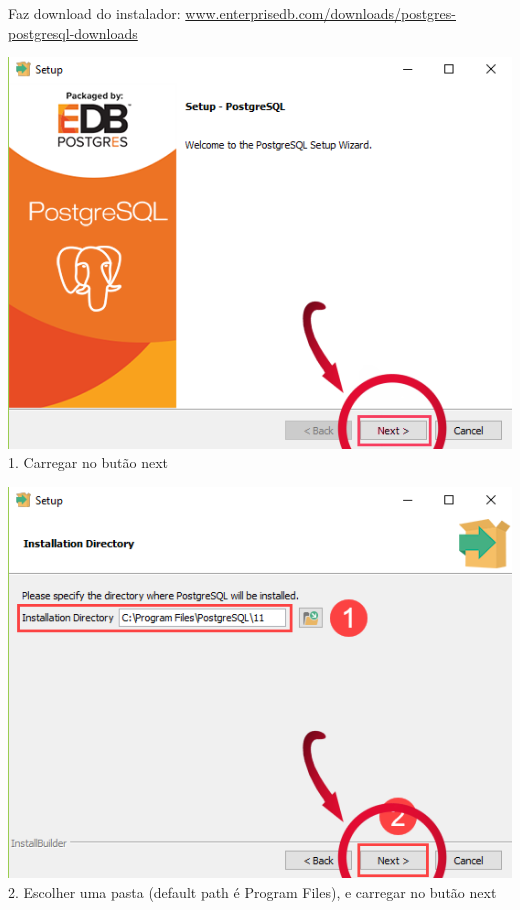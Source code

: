 \documentclass[a4paper, 11pt]{article}
\begin{document}
Faz download do instalador: \href{https://www.enterprisedb.com/downloads/postgres-postgresql-downloads}{www.enterprisedb.com/downloads/postgres-postgresql-downloads}

\begin{minipage}{0.45\textwidth}
  \includegraphics[width=\textwidth]{image.psd.png}
  1. Carregar no butão next
\end{minipage}\hfill
\begin{minipage}{0.45\textwidth}
  \includegraphics[width=\textwidth]{image.psd(1).png}
  2. Escolher uma pasta (default path é Program Files), e carregar no butão next
\end{minipage}
\end{document}
